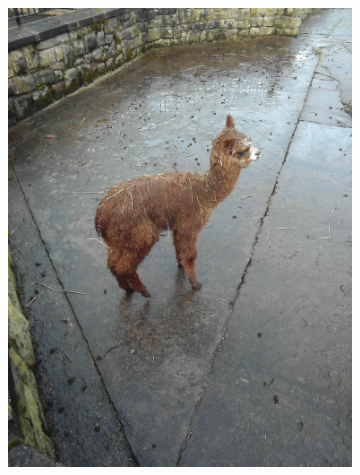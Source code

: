 \documentclass{l4proj}
\begin{document}
\begin{figure}[ht]
\begin{subfigure}[h!]{0.18\textwidth}
    \includegraphics[width=\textwidth, trim={0cm 6cm 0cm 6cm}, clip]{images/dataset/alpaca/rgb.png}

\end{subfigure}
\end{figure}
\end{document}
